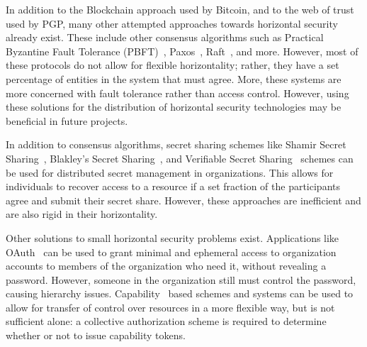 
In addition to the Blockchain approach used by Bitcoin, and to the web of trust
used by PGP, many other attempted approaches towards horizontal security already
exist. These include other consensus algorithms such as Practical Byzantine
Fault Tolerance (PBFT)~\cite{castro1999practical}, Paxos~\cite{lamport2019part}, 
Raft~\cite{ongaro2013search}, and more. However, most of these protocols do not
allow for flexible horizontality; rather, they have a set percentage of
entities in the system that must agree. More, these systems are more concerned
with fault tolerance rather than access control. However, using these solutions
for the distribution of horizontal security technologies may be beneficial in
future projects.

In addition to consensus algorithms, secret sharing schemes like Shamir Secret
Sharing~\cite{shamir1979share},
Blakley's Secret Sharing~\cite{blakley1993linear}, and Verifiable Secret 
Sharing~\cite{chor1985verifiable} schemes can be used for distributed secret
management in organizations. This allows for individuals to recover access to a
resource if a set fraction of the participants agree and submit their secret
share. However, these approaches are inefficient and are also rigid in their
horizontality.

Other solutions to small horizontal security problems exist. Applications like
OAuth~\cite{leiba2012oauth} can be used to grant minimal and ephemeral access to
organization accounts to members of the organization who need it, without
revealing a password. However, someone in the organization still must control
the password, causing hierarchy issues. Capability~\cite{dennis1966programming}
based schemes and systems can be used to allow for transfer of control over
resources in a more flexible way, but is not sufficient alone: a collective
authorization scheme is required to determine whether or not to issue capability
tokens. %

